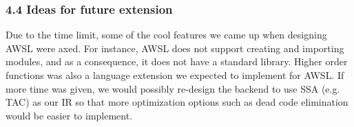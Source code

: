 \documentclass[10pt,a4paper]{report}
\begin{document}
  \subsubsection*{4.4 Ideas for future extension}
  Due to the time limit, some of the cool features we came up when designing
  AWSL were axed. For instance, AWSL does not support creating and importing
  modules, and as a consequence, it does not have a standard library. Higher
  order functions was also a language extension we expected to implement for
  AWSL. If more time was given, we would possibly re-design the backend to use
  SSA (e.g. TAC) as our IR so that more optimization options such as dead code
  elimination would be easier to implement.
  
\end{document}
